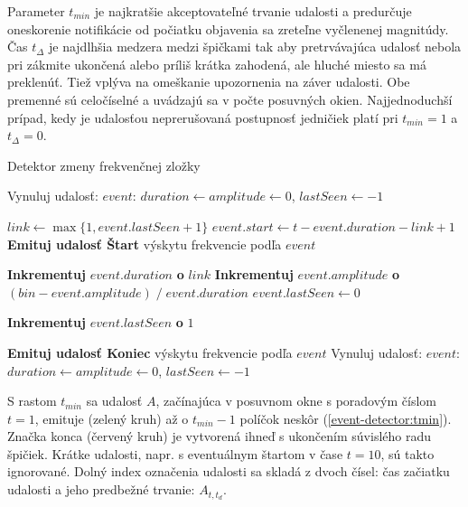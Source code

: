 Parameter $t_{min}$ je najkratšie akceptovateľné trvanie udalosti a predurčuje oneskorenie notifikácie od počiatku objavenia sa zreteľne
vyčlenenej magnitúdy. Čas $t_{\Delta}$ je najdlhšia medzera medzi špičkami tak aby pretrvávajúca udalosť nebola pri zákmite ukončená alebo
príliš krátka zahodená, ale hluché miesto sa má preklenúť. Tiež vplýva na omeškanie upozornenia na záver udalosti.
Obe premenné sú celočíselné a uvádzajú sa v počte posuvných okien. Najjednoduchší prípad, kedy je udalosťou
neprerušovaná postupnosť jedničiek platí pri $t_{min} = 1$ a $t_{\Delta} = 0$.
\begin{algorithm}[h]
\caption{Detektor zmeny frekvenčnej zložky}
\begin{algorithmic}[1]
	\State Vynuluj udalosť: $event$: $duration \gets amplitude \gets 0$, $lastSeen \gets -1$
\EndIf

	\State $link \gets \max\{1, event.lastSeen + 1\}$
		\State $event.start \gets t - event.duration - link + 1$
		\State \textbf{Emituj udalosť Štart} výskytu frekvencie podľa $event$
	\EndIf

	\State \textbf{Inkrementuj} $event.duration$ \textbf{o} $link$
	\State \textbf{Inkrementuj} $event.amplitude$ \textbf{o} $(bin - event.amplitude)\;/\;event.duration$
	\State $event.lastSeen \gets 0$

	\State \textbf{Inkrementuj} $event.lastSeen$ \textbf{o}  $1$

        		\State \textbf{Emituj udalosť Koniec} výskytu frekvencie podľa $event$
        	\EndIf
        \Else
        	\State Vynuluj udalosť: $event$: $duration \gets amplitude \gets 0$, $lastSeen \gets -1$
        \EndIf
\EndIf
\end{algorithmic}
\label{algo:event-detector}
\end{algorithm}

S rastom $t_{min}$ sa udalosť $A$, začínajúca v posuvnom okne s poradovým číslom
$t = 1$, emituje (zelený kruh) až o $t_{min} - 1$ políčok neskôr (\ref{event-detector:tmin}).
Značka konca (červený kruh) je vytvorená ihneď s ukončením súvislého radu špičiek. Krátke udalosti, napr. s eventuálnym štartom
v čase $t = 10$, sú takto ignorované. Dolný index označenia udalosti sa skladá z dvoch čísel: čas začiatku udalosti a jeho predbežné
trvanie: $A_{t,t_d}$.

